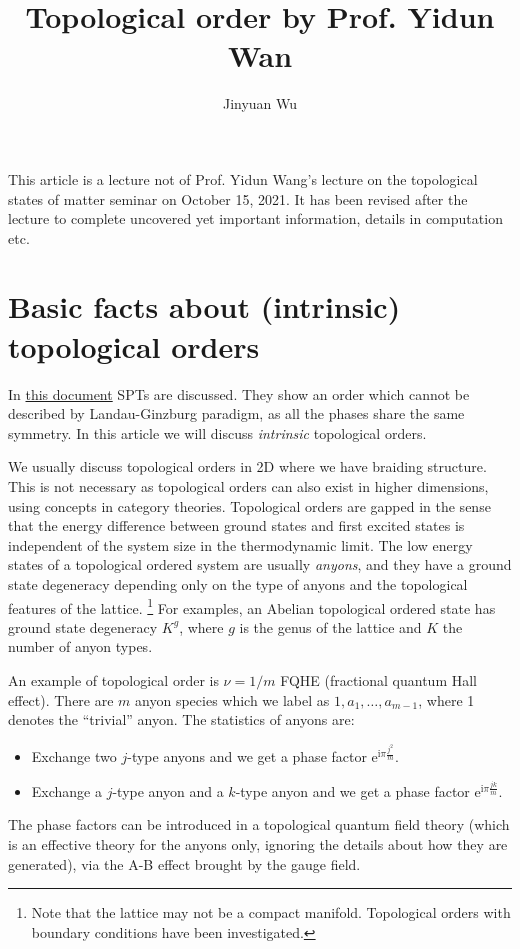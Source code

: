 \documentclass[hyperref, a4paper]{article}
\title{Topological order by Prof. Yidun Wan}
\author{Jinyuan Wu}
\newcommand*{\ii}{\mathrm{i}}
\newcommand*{\ee}{\mathrm{e}}
\begin{document}
\maketitle

This article is a lecture not of Prof. Yidun Wang's lecture on the topological states of matter seminar on October 15, 2021.
It has been revised after the lecture to complete uncovered yet important information, details in computation etc.

\section{Basic facts about (intrinsic) topological orders}

In \href{./2021-10-8}{this document} SPTs are discussed. 
They show an order which cannot be described by Landau-Ginzburg paradigm, as all the phases share the same symmetry. 
In this article we will discuss \emph{intrinsic} topological orders.

We usually discuss topological orders in 2D where we have braiding structure. 
This is not necessary as topological orders can also exist in higher dimensions, using concepts in category theories.
Topological orders are gapped in the sense that the energy difference between ground states and first excited states is independent of the system size in the thermodynamic limit.
The low energy states of a topological ordered system are usually \emph{anyons}, 
and they have a ground state degeneracy depending only on the type of anyons and the topological features of the lattice.%
\footnote{
    Note that the lattice may not be a compact manifold. Topological orders with boundary conditions have been investigated.
}%
For examples, an Abelian topological ordered state has ground state degeneracy $K^g$, where $g$ is the genus of the lattice and $K$ the number of anyon types.

An example of topological order is $\nu = 1 / m$ FQHE (fractional quantum Hall effect). There are $m$ anyon species which we label as $1, a_1, \ldots, a_{m-1}$, where 1 denotes the ``trivial'' anyon.
The statistics of anyons are:
\begin{itemize}
    \item Exchange two $j$-type anyons and we get a phase factor $\ee^{\ii \pi \frac{j^2}{m}}$.
    \item Exchange a $j$-type anyon and a $k$-type anyon and we get a phase factor $\ee^{\ii \pi \frac{jk}{m}}$.
\end{itemize}
The phase factors can be introduced in a topological quantum field theory (which is an effective theory for the anyons only, ignoring the details about how they are generated), via the A-B effect brought by the gauge field.
\end{document}
